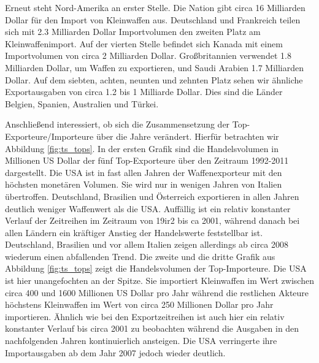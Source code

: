 \documentclass[a4paper,ngerman,oneside,titlepage,bibliography=totoc,11pt]{scrreprt}
\begin{document}
Erneut steht Nord-Amerika an erster Stelle. Die Nation gibt circa 16 Milliarden Dollar für den Import von Kleinwaffen aus. Deutschland und Frankreich teilen sich mit 2.3 Milliarden Dollar Importvolumen den zweiten Platz am Kleinwaffenimport. Auf der vierten Stelle befindet sich Kanada mit einem Importvolumen von circa 2 Milliarden Dollar. Großbritannien verwendet 1.8 Milliarden Dollar, um Waffen zu exportieren, und Saudi Arabien 1.7 Milliarden Dollar. Auf dem siebten, achten, neunten und zehnten Platz sehen wir ähnliche Exportausgaben von circa 1.2 bis 1 Milliarde Dollar. Dies sind die Länder Belgien, Spanien, Australien und Türkei.

Anschließend interessiert, ob sich die Zusammensetzung der Top-Exporteure/Importeure über die Jahre verändert. Hierfür betrachten wir Abbildung \ref{fig:ts_tops}. 
In der ersten Grafik sind die Handelsvolumen in Millionen US Dollar der fünf Top-Exporteure über den Zeitraum 1992-2011 dargestellt. Die USA ist in fast allen Jahren der Waffenexporteur mit den höchsten monetären Volumen. Sie wird nur in wenigen Jahren von Italien übertroffen. Deutschland, Brasilien und Österreich exportieren in allen Jahren deutlich weniger Waffenwert als die USA. Auffällig ist ein relativ konstanter Verlauf der Zeitreihen im Zeitraum von 19ir2 bis ca 2001, während danach bei allen Ländern ein kräftiger Anstieg der Handelswerte feststellbar ist. Deutschland, Brasilien und vor allem Italien zeigen allerdings ab circa 2008 wiederum einen abfallenden Trend.
Die zweite und die dritte Grafik aus Abbildung \ref{fig:ts_tops} zeigt die Handelsvolumen der Top-Importeure. Die USA ist hier unangefochten an der Spitze. Sie importiert Kleinwaffen im Wert zwischen circa 400 und 1600 Millionen US Dollar pro Jahr während die restlichen Akteure höchstens Kleinwaffen im Wert von circa 250 Millionen Dollar pro Jahr importieren. Ähnlich wie bei den Exportzeitreihen ist auch hier ein relativ konstanter Verlauf bis circa 2001 zu beobachten während die Ausgaben in den nachfolgenden Jahren kontinuierlich ansteigen. Die USA verringerte ihre Importausgaben ab dem Jahr 2007 jedoch wieder deutlich. 
\end{document}

